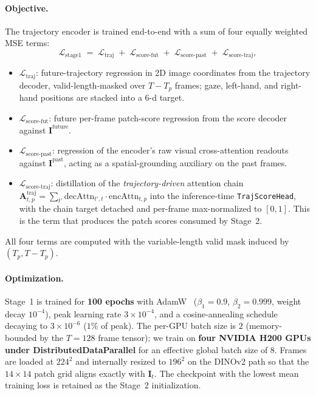\paragraph{Objective.}
The trajectory encoder is trained end-to-end with a sum of four equally
weighted MSE terms:
\begin{equation}
    \mathcal{L}_{\text{stage1}}
    \;=\; \mathcal{L}_\text{traj}
       \;+\; \mathcal{L}_\text{score-fut}
       \;+\; \mathcal{L}_\text{score-past}
       \;+\; \mathcal{L}_\text{score-traj} ,
    \label{eq:stage1}
\end{equation}
\begin{itemize}\itemsep1pt
\item $\mathcal{L}_\text{traj}$: future-trajectory regression in 2D image
      coordinates from the trajectory decoder, valid-length-masked over
      $T-T_p$ frames; gaze, left-hand, and right-hand positions are
      stacked into a $6$-d target.
\item $\mathcal{L}_\text{score-fut}$: future per-frame patch-score
      regression from the score decoder against
      $\mathbf{I}^{\text{future}}$.
\item $\mathcal{L}_\text{score-past}$: regression of the encoder's raw
      visual cross-attention readouts against $\mathbf{I}^{\text{past}}$,
      acting as a spatial-grounding auxiliary on the past frames.
\item $\mathcal{L}_\text{score-traj}$: distillation of the
      \emph{trajectory-driven} attention chain
      $\mathbf{A}^{\text{traj}}_{t,p}
      = \sum_{t'} \mathrm{decAttn}_{t', t}\!\cdot\!\mathrm{encAttn}_{t, p}$
      into the inference-time \texttt{TrajScoreHead}, with the chain
      target detached and per-frame max-normalized to $[0,1]$. This is
      the term that produces the patch scores consumed by Stage~2.
\end{itemize}
All four terms are computed with the variable-length valid mask induced by
$(T_p, T-T_p)$.

\paragraph{Optimization.}
Stage~1 is trained for \textbf{100 epochs} with
AdamW~\citep{loshchilov2019adamw}
($\beta_1{=}0.9$, $\beta_2{=}0.999$, weight decay $10^{-4}$), peak learning
rate $3{\times}10^{-4}$, and a cosine-annealing schedule decaying to
$3{\times}10^{-6}$ ($1\%$ of peak). The per-GPU batch size is $2$
(memory-bounded by the $T{=}128$ frame tensor); we train on
\textbf{four NVIDIA H200 GPUs under DistributedDataParallel} for an
effective global batch size of $8$. Frames are loaded at $224^2$ and
internally resized to $196^2$ on the DINOv2 path so that the $14{\times}14$
patch grid aligns exactly with $\mathbf{I}_t$. The checkpoint with the
lowest mean training loss is retained as the Stage~2 initialization.

